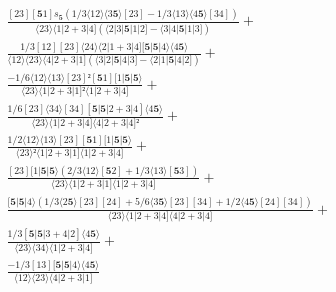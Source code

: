 \documentclass[varwidth, border=5pt]{standalone}
\begin{document}
\begin{my}
$\begin{gathered}
\scriptscriptstyle\frac{[23][𝟓1]s_{𝟓}(1/3⟨12⟩⟨3𝟓⟩[23]-1/3⟨13⟩⟨4𝟓⟩[34])}{⟨23⟩⟨1|2+3|4](⟨2|3|𝟓|1|2]-⟨3|4|𝟓|1|3])} +\\
\scriptscriptstyle\frac{1/3[12][23]⟨24⟩⟨2|1+3|4][𝟓|𝟓|4⟩⟨4𝟓⟩}{⟨12⟩⟨23⟩⟨4|2+3|1](⟨3|2|𝟓|4|3]-⟨2|1|𝟓|4|2])} +\\
\scriptscriptstyle\frac{-1/6⟨12⟩⟨13⟩[23]²[𝟓1][1|𝟓|𝟓⟩}{⟨23⟩⟨1|2+3|1]²⟨1|2+3|4]} +\\
\scriptscriptstyle\frac{1/6[23]⟨34⟩[34][𝟓|𝟓|2+3|4]⟨4𝟓⟩}{⟨23⟩⟨1|2+3|4]⟨4|2+3|4]²} +\\
\scriptscriptstyle\frac{1/2⟨12⟩⟨13⟩[23][𝟓1][1|𝟓|𝟓⟩}{⟨23⟩²⟨1|2+3|1]⟨1|2+3|4]} +\\
\scriptscriptstyle\frac{[23][1|𝟓|𝟓⟩(2/3⟨12⟩[𝟓2]+1/3⟨13⟩[𝟓3])}{⟨23⟩⟨1|2+3|1]⟨1|2+3|4]} +\\
\scriptscriptstyle\frac{[𝟓|𝟓|4⟩(1/3⟨2𝟓⟩[23][24]+5/6⟨3𝟓⟩[23][34]+1/2⟨4𝟓⟩[24][34])}{⟨23⟩⟨1|2+3|4]⟨4|2+3|4]} +\\
\scriptscriptstyle\frac{1/3[𝟓|𝟓|3+4|2]⟨4𝟓⟩}{⟨23⟩⟨34⟩⟨1|2+3|4]} +\\
\scriptscriptstyle\frac{-1/3[13][𝟓|𝟓|4⟩⟨4𝟓⟩}{⟨12⟩⟨23⟩⟨4|2+3|1]} \phantom{+}
\end{gathered}$
\end{my}
\end{document}

